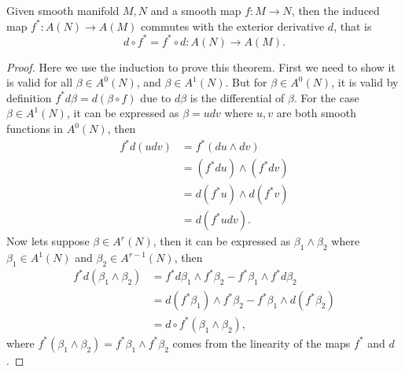 \begin{theorem}
Given smooth manifold $M,N$ and a smooth map $f:M\to N$, then the induced map $f^*:A(N)\to A(M)$  commutes with the exterior derivative $d$, that is
\begin{equation}
d\circ f^*=f^*\circ d: A(N)\to A(M).
\end{equation}
\end{theorem}

\begin{proof}
Here we use the induction to prove this theorem. First we need to show it is valid for all $\beta\in A^0(N)$, and $\beta\in A^1(N)$. But for $\beta\in A^0(N)$, it is valid by definition $f^*d\beta=d(\beta\circ f)$ due to $d\beta$ is the differential of $\beta$. For the case $\beta\in A^1(N)$, it can be expressed as $\beta=udv$ where $u,v$ are both smooth functions in $A^0(N)$, then
\begin{equation*}
\begin{aligned}
f^*d(udv) &=f^*(du\wedge dv)\\
&=(f^*du)\wedge(f^*dv)\\
&=d(f^*u)\wedge d(f^*v)\\
&=d(f^*udv).
\end{aligned}
\end{equation*}
Now lets suppose $\beta\in A^r(N)$, then it can be expressed as $\beta_1\wedge\beta_2$ where $\beta_1\in A^1(N)$ and $\beta_2\in A^{r-1}(N)$, then
\begin{equation*}
\begin{aligned}
f^*d(\beta_1\wedge\beta_2)&=f^*d\beta_1\wedge f^*\beta_2-f^*\beta_1\wedge f^*d\beta_2\\
&=d(f^*\beta_1)\wedge f^*\beta_2-f^*\beta_1\wedge d(f^*\beta_2)\\
&=d\circ f^*(\beta_1\wedge\beta_2),
\end{aligned}
\end{equation*}
where $f^*(\beta_1\wedge\beta_2)=f^*\beta_1\wedge f^*\beta_2$ comes from the linearity of the maps $f^*$ and $d$.
\end{proof}